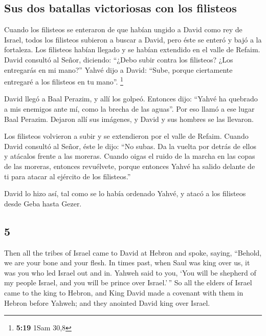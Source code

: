 \begin{paracol}{2}
\hypertarget{sus-dos-batallas-victoriosas-con-los-filisteos}{%
\subsection{Sus dos batallas victoriosas con los
filisteos}\label{sus-dos-batallas-victoriosas-con-los-filisteos}}

 Cuando los filisteos se enteraron de que habían ungido a
David como rey de Israel, todos los filisteos subieron a buscar a David,
pero éste se enteró y bajó a la fortaleza.  Los filisteos
habían llegado y se habían extendido en el valle de Refaim.
 David consultó al Señor, diciendo: ``¿Debo subir contra
los filisteos? ¿Los entregarás en mi mano?'' Yahvé dijo a David: ``Sube,
porque ciertamente entregaré a los filisteos en tu mano''. \footnote{\textbf{5:19}
  1Sam 30,8}

 David llegó a Baal Perazim, y allí los golpeó. Entonces
dijo: ``Yahvé ha quebrado a mis enemigos ante mí, como la brecha de las
aguas''. Por eso llamó a ese lugar Baal Perazim.  Dejaron
allí sus imágenes, y David y sus hombres se las llevaron.

 Los filisteos volvieron a subir y se extendieron por el
valle de Refaim.  Cuando David consultó al Señor, éste le
dijo: ``No subas. Da la vuelta por detrás de ellos y atácalos frente a
las moreras.  Cuando oigas el ruido de la marcha en las
copas de las moreras, entonces revuélvete, porque entonces Yahvé ha
salido delante de ti para atacar al ejército de los filisteos.''

 David lo hizo así, tal como se lo había ordenado Yahvé,
y atacó a los filisteos desde Geba hasta Gezer.

\switchcolumn
\begin{otherlanguage}{english}

\hypertarget{section-9}{%
\section{5}\label{section-9}}

 Then all the tribes of Israel came to David at Hebron and
spoke, saying, ``Behold, we are your bone and your flesh. 
In times past, when Saul was king over us, it was you who led Israel out
and in. Yahweh said to you, `You will be shepherd of my people Israel,
and you will be prince over Israel.'\,''  So all the
elders of Israel came to the king to Hebron, and King David made a
covenant with them in Hebron before Yahweh; and they anointed David king
over Israel.


\end{otherlanguage}
\end{paracol}
